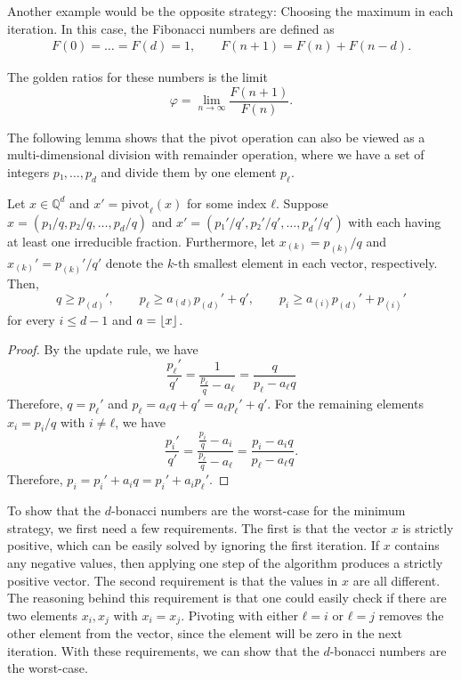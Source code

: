 Another example would be the opposite strategy: Choosing the maximum in each iteration.
In this case, the Fibonacci numbers are defined as
\begin{align*}
  F(0) = \dots = F(d) = 1, \qquad F(n + 1) = F(n) + F(n - d).
\end{align*}

The golden ratios for these numbers is the limit
\[
  φ = \lim_{n → ∞} \frac{F(n + 1)}{F(n)}.
\]


The following lemma shows that the $\mathrm{pivot}$ operation can also be
viewed as a multi-dimensional division with remainder operation, where we have
a set of integers $p₁, …, p_d$ and divide them by one element $p_ℓ$.

\begin{lemma}
  \label{lem:divmod}
  Let $x ∈ ℚ^d$ and $x' = \mathrm{pivot}_ℓ(x)$ for some index $ℓ$.
  Suppose $x = (p₁/q, p₂/q, …, p_d/q)$ and $x' = (p₁'/q', p₂'/q', …, p_d'/q')$
  with each having at least one irreducible fraction.
  Furthermore, let $x_{(k)} = p_{(k)}/q$ and $x_{(k)}' = p_{(k)}'/q'$ denote
  the $k$-th smallest element in each vector, respectively.
  Then,
  \[
    q ≥ p_{(d)}',
    \qquad
    p_ℓ ≥ a_{(d)} p_{(d)}' + q',
    \qquad
    p_i ≥ a_{(i)} p_{(d)}' + p_{(i)}'
  \]
  for every $i ≤ d - 1$ and $a = \lfloor x\rfloor$.
\end{lemma}

\begin{proof}
  By the update rule, we have
  \[
    \frac{p_ℓ'}{q'} = \frac{1}{\frac{p_ℓ}{q} - a_ℓ} = \frac{q}{p_ℓ - a_ℓ q}
  \]
  Therefore, $q = p_ℓ'$ and $p_ℓ = a_ℓ q + q' = a_ℓ p_ℓ' + q'$.
  For the remaining elements $x_i = p_i/q$ with $i ≠ ℓ$, we have
  \[
    \frac{p_i'}{q'} = \frac{\frac{p_i}{q} - a_i}{\frac{p_ℓ}{q} - a_ℓ} = \frac{p_i - a_i q}{p_ℓ - a_ℓ q}.
  \]
  Therefore, $p_i = p_i' + a_i q = p_i' + a_i p_ℓ'$.
\end{proof}

To show that the $d$-bonacci numbers are the worst-case for the minimum
strategy, we first need a few requirements.
The first is that the vector $x$ is strictly positive,
which can be easily solved by ignoring the first iteration.
If $x$ contains any negative values, then applying one step of the algorithm
produces a strictly positive vector.
The second requirement is that the values in $x$ are all different.
The reasoning behind this requirement is that one could easily check if there
are two elements $x_i, x_j$ with $x_i = x_j$.
Pivoting with either $ℓ = i$ or $ℓ = j$ removes the other element from the
vector, since the element will be zero in the next iteration.
With these requirements, we can show that the $d$-bonacci numbers are the worst-case.

